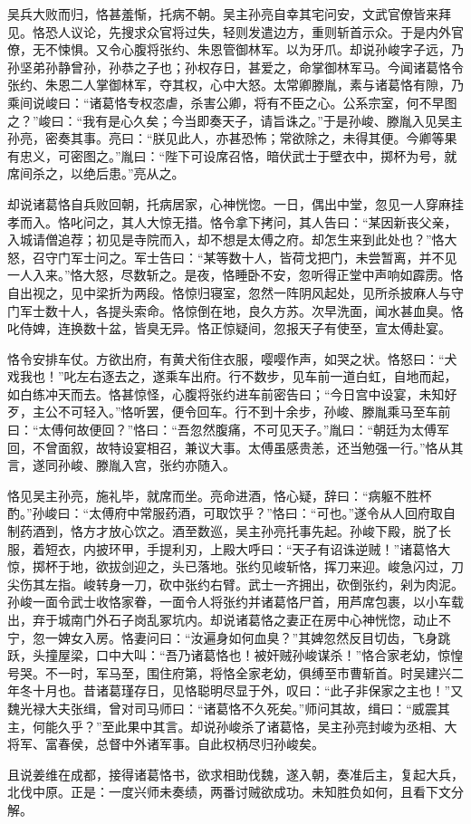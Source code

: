 吴兵大败而归，恪甚羞惭，托病不朝。吴主孙亮自幸其宅问安，文武官僚皆来拜见。恪恐人议论，先搜求众官将过失，轻则发遣边方，重则斩首示众。于是内外官僚，无不悚惧。又令心腹将张约、朱恩管御林军。以为牙爪。却说孙峻字子远，乃孙坚弟孙静曾孙，孙恭之子也；孙权存日，甚爱之，命掌御林军马。今闻诸葛恪令张约、朱恩二人掌御林军，夺其权，心中大怒。太常卿滕胤，素与诸葛恪有隙，乃乘间说峻曰：“诸葛恪专权恣虐，杀害公卿，将有不臣之心。公系宗室，何不早图之？”峻曰：“我有是心久矣；今当即奏天子，请旨诛之。”于是孙峻、滕胤入见吴主孙亮，密奏其事。亮曰：“朕见此人，亦甚恐怖；常欲除之，未得其便。今卿等果有忠义，可密图之。”胤曰：“陛下可设席召恪，暗伏武士于壁衣中，掷杯为号，就席间杀之，以绝后患。”亮从之。

却说诸葛恪自兵败回朝，托病居家，心神恍惚。一日，偶出中堂，忽见一人穿麻挂孝而入。恪叱问之，其人大惊无措。恪令拿下拷问，其人告曰：“某因新丧父亲，入城请僧追荐；初见是寺院而入，却不想是太傅之府。却怎生来到此处也？”恪大怒，召守门军士问之。军士告曰：“某等数十人，皆荷戈把门，未尝暂离，并不见一人入来。”恪大怒，尽数斩之。是夜，恪睡卧不安，忽听得正堂中声响如霹雳。恪自出视之，见中梁折为两段。恪惊归寝室，忽然一阵阴风起处，见所杀披麻人与守门军士数十人，各提头索命。恪惊倒在地，良久方苏。次早洗面，闻水甚血臭。恪叱侍婢，连换数十盆，皆臭无异。恪正惊疑间，忽报天子有使至，宣太傅赴宴。

恪令安排车仗。方欲出府，有黄犬衔住衣服，嘤嘤作声，如哭之状。恪怒曰：“犬戏我也！”叱左右逐去之，遂乘车出府。行不数步，见车前一道白虹，自地而起，如白练冲天而去。恪甚惊怪，心腹将张约进车前密告曰；“今日宫中设宴，未知好歹，主公不可轻入。”恪听罢，便令回车。行不到十余步，孙峻、滕胤乘马至车前曰：“太傅何故便回？”恪曰：“吾忽然腹痛，不可见天子。”胤曰：“朝廷为太傅军回，不曾面叙，故特设宴相召，兼议大事。太傅虽感贵恙，还当勉强一行。”恪从其言，遂同孙峻、滕胤入宫，张约亦随入。

恪见吴主孙亮，施礼毕，就席而坐。亮命进酒，恪心疑，辞曰：“病躯不胜杯酌。”孙峻曰：“太傅府中常服药酒，可取饮乎？”恪曰：“可也。”遂令从人回府取自制药酒到，恪方才放心饮之。酒至数巡，吴主孙亮托事先起。孙峻下殿，脱了长服，着短衣，内披环甲，手提利刃，上殿大呼曰：“天子有诏诛逆贼！”诸葛恪大惊，掷杯于地，欲拔剑迎之，头已落地。张约见峻斩恪，挥刀来迎。峻急闪过，刀尖伤其左指。峻转身一刀，砍中张约右臂。武士一齐拥出，砍倒张约，剁为肉泥。孙峻一面令武士收恪家眷，一面令人将张约并诸葛恪尸首，用芦席包裹，以小车载出，弃于城南门外石子岗乱冢坑内。却说诸葛恪之妻正在房中心神恍惚，动止不宁，忽一婢女入房。恪妻问曰：“汝遍身如何血臭？”其婢忽然反目切齿，飞身跳跃，头撞屋梁，口中大叫：“吾乃诸葛恪也！被奸贼孙峻谋杀！”恪合家老幼，惊惶号哭。不一时，军马至，围住府第，将恪全家老幼，俱缚至市曹斩首。时吴建兴二年冬十月也。昔诸葛瑾存日，见恪聪明尽显于外，叹曰：“此子非保家之主也！”又魏光禄大夫张缉，曾对司马师曰：“诸葛恪不久死矣。”师问其故，缉曰：“威震其主，何能久乎？”至此果中其言。却说孙峻杀了诸葛恪，吴主孙亮封峻为丞相、大将军、富春侯，总督中外诸军事。自此权柄尽归孙峻矣。

且说姜维在成都，接得诸葛恪书，欲求相助伐魏，遂入朝，奏准后主，复起大兵，北伐中原。正是：一度兴师未奏绩，两番讨贼欲成功。未知胜负如何，且看下文分解。